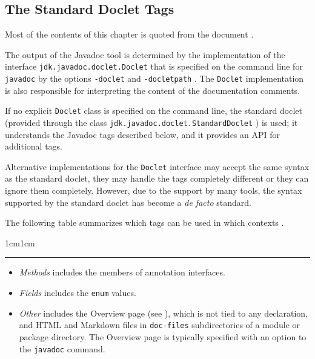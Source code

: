 \subsection{The Standard Doclet Tags}
Most of the contents of this chapter is quoted from the document  \autocite{ORACLE_DOC_JAVADOC_TAG}. 

The output of the Javadoc tool is determined by the implementation of the interface \lstinline|jdk.javadoc.doclet.Doclet| \autocite{ORACLE_DOC_DOCLET_INTERFACE} that is specified on the command line for \texttt{javadoc} by the options \texttt{-doclet} and \texttt{-docletpath} \autocite{ORACLE_TOOL:javadoc:options}. The \lstinline|Doclet| implementation is also responsible for interpreting the content of the documentation comments.

If no explicit \lstinline|Doclet| class is specified on the command line, the standard doclet (provided through the class \lstinline|jdk.javadoc.doclet.StandardDoclet| \autocite{ORACLE_DOC_STANDARDDOCLET_CLASS}) is used; it understands the Javadoc tags described below, and it provides an API for additional tags.

Alternative implementations for the \lstinline|Doclet| interface may accept the same syntax as the standard doclet, they may handle the tags completely different or they can ignore them completely. However, due to the support by many tools, the syntax supported by the standard doclet has become a \textit{de facto} standard.

The following table summarizes which tags can be used in which contexts \autocite{ORACLE_DOC_JAVADOC_TAG:Where}.


\begin{adjustwidth}{1cm}{1cm}
	\noindent\rule{\linewidth}{0.4pt}
	\begin{itemize}
		\item{\textit{Methods} includes the members of annotation interfaces.}
		\item{\textit{Fields} includes the \lstinline|enum| values.}
		\item{\textit{Other} includes the Overview page (see ), which is not tied to any declaration, and HTML and Markdown files in \texttt{doc-files} subdirectories of a module or package directory. The Overview page is typically specified with an option to the \texttt{javadoc} command.}
	\end{itemize}
	\renewcommand{\cellalign}{tl}
\end{adjustwidth}

